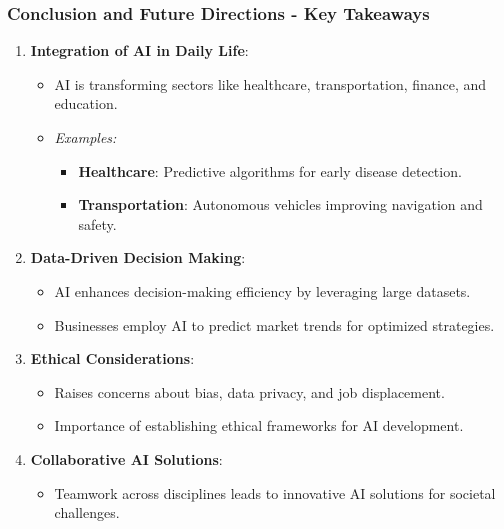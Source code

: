 \documentclass{beamer}
\begin{document}
\begin{frame}[fragile]
    \frametitle{Conclusion and Future Directions - Key Takeaways}
    \begin{enumerate}
        \item \textbf{Integration of AI in Daily Life}:
        \begin{itemize}
            \item AI is transforming sectors like healthcare, transportation, finance, and education.
            \item \textit{Examples:}
            \begin{itemize}
                \item \textbf{Healthcare}: Predictive algorithms for early disease detection.
                \item \textbf{Transportation}: Autonomous vehicles improving navigation and safety.
            \end{itemize}
        \end{itemize}
        
        \item \textbf{Data-Driven Decision Making}:
        \begin{itemize}
            \item AI enhances decision-making efficiency by leveraging large datasets.
            \item Businesses employ AI to predict market trends for optimized strategies.
        \end{itemize}
        
        \item \textbf{Ethical Considerations}:
        \begin{itemize}
            \item Raises concerns about bias, data privacy, and job displacement.
            \item Importance of establishing ethical frameworks for AI development.
        \end{itemize}
        
        \item \textbf{Collaborative AI Solutions}:
        \begin{itemize}
            \item Teamwork across disciplines leads to innovative AI solutions for societal challenges.
        \end{itemize}
    \end{enumerate}
\end{frame}
\end{document}

